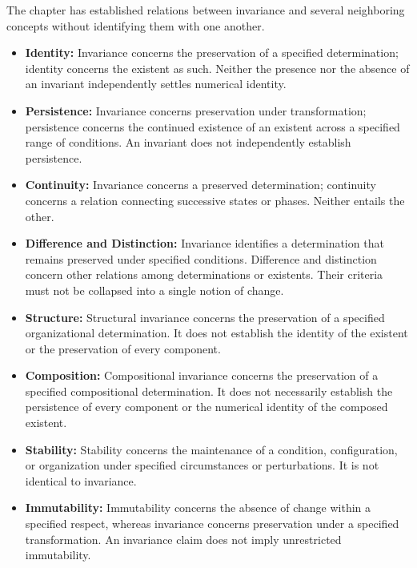 The chapter has established relations between
invariance and several neighboring concepts without
identifying them with one another.

\begin{itemize}
    \item \textbf{Identity:}
          Invariance concerns the preservation of a
          specified determination; identity concerns
          the existent as such. Neither the presence
          nor the absence of an invariant independently
          settles numerical identity.

    \item \textbf{Persistence:}
          Invariance concerns preservation under
          transformation; persistence concerns the
          continued existence of an existent across
          a specified range of conditions. An invariant
          does not independently establish persistence.

    \item \textbf{Continuity:}
          Invariance concerns a preserved determination;
          continuity concerns a relation connecting
          successive states or phases. Neither entails
          the other.

    \item \textbf{Difference and Distinction:}
          Invariance identifies a determination that
          remains preserved under specified conditions.
          Difference and distinction concern other
          relations among determinations or existents.
          Their criteria must not be collapsed into
          a single notion of change.

    \item \textbf{Structure:}
          Structural invariance concerns the preservation
          of a specified organizational determination.
          It does not establish the identity of the
          existent or the preservation of every component.

    \item \textbf{Composition:}
          Compositional invariance concerns the preservation
          of a specified compositional determination.
          It does not necessarily establish the persistence
          of every component or the numerical identity
          of the composed existent.

    \item \textbf{Stability:}
          Stability concerns the maintenance of a condition,
          configuration, or organization under specified
          circumstances or perturbations. It is not
          identical to invariance.

    \item \textbf{Immutability:}
          Immutability concerns the absence of change
          within a specified respect, whereas invariance
          concerns preservation under a specified
          transformation. An invariance claim does not
          imply unrestricted immutability.
\end{itemize}

